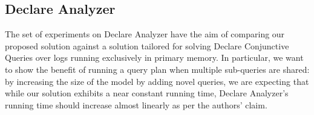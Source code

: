 \subsection{Declare Analyzer}\label{ssec:declan}
The set of experiments on Declare Analyzer have the aim of comparing our proposed solution against a solution tailored for solving Declare Conjunctive Queries over logs running exclusively in primary memory. In particular, we want to show the benefit of running a query plan when multiple sub-queries are shared: by increasing the size of the model by adding novel queries, we are expecting that while our solution exhibits a near constant running time, Declare Analyzer's running time should increase almost linearly as per the authors' claim.
\begin{table}[!t]
	\caption{Declare Models with their Respective Clauses}
\end{table}

